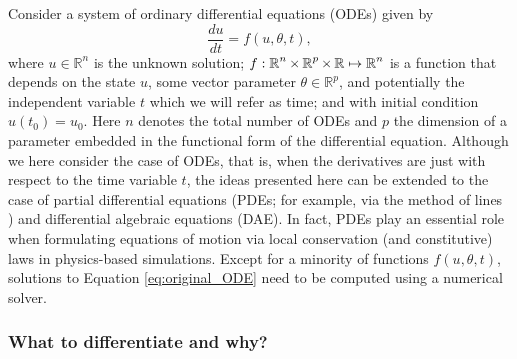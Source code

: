 Consider a system of ordinary differential equations (ODEs) given by
\begin{equation}
 \frac{du}{dt} = f(u, \theta, t),
 \label{eq:original_ODE}
\end{equation}
where $u \in \mathbb{R}^n$ is the unknown solution; $f: \operatorname{\mathbb{R}}^n \times \operatorname{\mathbb{R}}^p \times \operatorname{\mathbb{R}} \mapsto \operatorname{\mathbb{R}}^n$ is a function that depends on the state $u$, some vector parameter $\theta \in \mathbb R^p$, and potentially the independent variable $t$ which we will refer as time; and with initial condition $u(t_0) = u_0$.
Here $n$ denotes the total number of ODEs and $p$ the dimension of a parameter embedded in the functional form of the differential equation.
Although we here consider the case of ODEs, that is, when the derivatives are just with respect to the time variable $t$, the ideas presented here can be extended to the case of partial differential equations (PDEs; for example, via the method of lines \cite{ascher2008numerical}) and differential algebraic equations (DAE).
In fact, PDEs play an essential role when formulating equations of motion via local conservation (and constitutive) laws in physics-based simulations.
Except for a minority of functions $f(u,\theta, t)$, solutions to Equation \eqref{eq:original_ODE} need to be computed using a numerical solver. 

\subsubsection{What to differentiate and why?}

